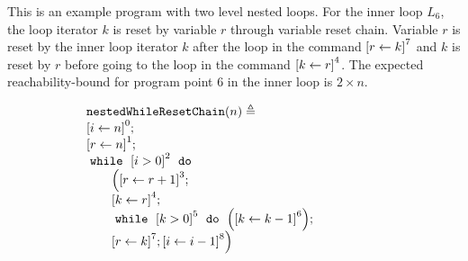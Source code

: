 \begin{example}
  \label{ex:nestedWhileResetChain}
This is an example program with two level nested loops. For the inner loop $L_6$, 
the loop iterator $k$ is reset by variable $r$ through variable reset chain.
Variable $r$ is reset by the inner loop iterator $k$ after the loop in the command
$\clabel{\assign{r}{k}}^{7}$ and $k$ is reset by $r$ before going to the loop in the command 
$\clabel{\assign{k}{r}}^{4}$.
The expected reachability-bound for
program point $6$ in the inner loop is $2 \times n$.


  { \small
\begin{figure}
\centering
\begin{subfigure}{.4\textwidth}
  \begin{centering}
  {\small
  $
  \begin{array}{l}
      \kw{nestedWhileResetChain}(n) \triangleq \\
      \clabel{ \assign{i}{n} }^{0} ; \\
      \clabel{ \assign{r}{n} }^{1} ; \\
          \ewhile ~ \clabel{i > 0}^{2} ~ \edo ~ \\
          \qquad \Big( \clabel{\assign{r}{r + 1}}^{3};\\
            \qquad  \clabel{\assign{k}{r}}^{4};\\
            \qquad \ewhile ~ \clabel{k > 0}^{5} ~ \edo ~
            \Big( \clabel{\assign{k}{k - 1}}^{6}   \Big); \\
                \qquad \clabel{\assign{r}{k}}^{7};
                \clabel{\assign{i}{i-1}}^{8}
            \Big)
      \end{array}
  $
  }
  \caption{}
  \end{centering}
  \end{subfigure}
\begin{subfigure}{.5\textwidth}
  \begin{centering}
\end{centering}
\end{subfigure}
\end{figure}}
\end{example}
